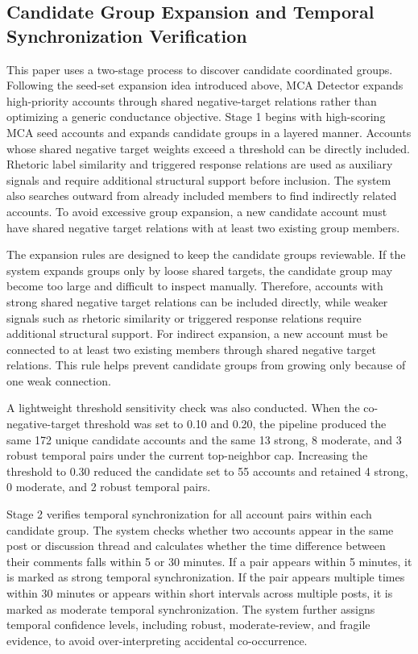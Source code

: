 \documentclass[conference]{IEEEtran}
\begin{document}
\subsection{Candidate Group Expansion and Temporal Synchronization Verification}
This paper uses a two-stage process to discover candidate coordinated groups. Following the seed-set expansion idea introduced above, MCA Detector expands high-priority accounts through shared negative-target relations rather than optimizing a generic conductance objective. Stage 1 begins with high-scoring MCA seed accounts and expands candidate groups in a layered manner. Accounts whose shared negative target weights exceed a threshold can be directly included. Rhetoric label similarity and triggered response relations are used as auxiliary signals and require additional structural support before inclusion. The system also searches outward from already included members to find indirectly related accounts. To avoid excessive group expansion, a new candidate account must have shared negative target relations with at least two existing group members.

The expansion rules are designed to keep the candidate groups reviewable. If the system expands groups only by loose shared targets, the candidate group may become too large and difficult to inspect manually. Therefore, accounts with strong shared negative target relations can be included directly, while weaker signals such as rhetoric similarity or triggered response relations require additional structural support. For indirect expansion, a new account must be connected to at least two existing members through shared negative target relations. This rule helps prevent candidate groups from growing only because of one weak connection.

A lightweight threshold sensitivity check was also conducted. When the co-negative-target threshold was set to 0.10 and 0.20, the pipeline produced the same 172 unique candidate accounts and the same 13 strong, 8 moderate, and 3 robust temporal pairs under the current top-neighbor cap. Increasing the threshold to 0.30 reduced the candidate set to 55 accounts and retained 4 strong, 0 moderate, and 2 robust temporal pairs.

Stage 2 verifies temporal synchronization for all account pairs within each candidate group. The system checks whether two accounts appear in the same post or discussion thread and calculates whether the time difference between their comments falls within 5 or 30 minutes. If a pair appears within 5 minutes, it is marked as strong temporal synchronization. If the pair appears multiple times within 30 minutes or appears within short intervals across multiple posts, it is marked as moderate temporal synchronization. The system further assigns temporal confidence levels, including robust, moderate-review, and fragile evidence, to avoid over-interpreting accidental co-occurrence.
\end{document}
